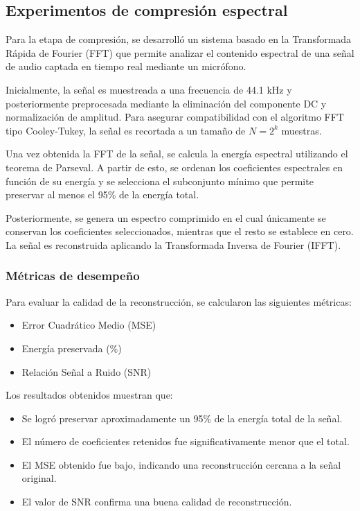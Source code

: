 \documentclass[12pt, journal]{IEEEtran}
\begin{document}
\subsection{Experimentos de compresión espectral}

Para la etapa de compresión, se desarrolló un sistema basado en la Transformada Rápida de Fourier (FFT) que permite analizar el contenido espectral de una señal de audio captada en tiempo real mediante un micrófono.

Inicialmente, la señal es muestreada a una frecuencia de 44.1 kHz y posteriormente preprocesada mediante la eliminación del componente DC y normalización de amplitud. Para asegurar compatibilidad con el algoritmo FFT tipo Cooley-Tukey, la señal es recortada a un tamaño de $N = 2^k$ muestras.

Una vez obtenida la FFT de la señal, se calcula la energía espectral utilizando el teorema de Parseval. A partir de esto, se ordenan los coeficientes espectrales en función de su energía y se selecciona el subconjunto mínimo que permite preservar al menos el 95\% de la energía total.

Posteriormente, se genera un espectro comprimido en el cual únicamente se conservan los coeficientes seleccionados, mientras que el resto se establece en cero. La señal es reconstruida aplicando la Transformada Inversa de Fourier (IFFT).

\subsubsection{Métricas de desempeño}

Para evaluar la calidad de la reconstrucción, se calcularon las siguientes métricas:

\begin{itemize}
    \item Error Cuadrático Medio (MSE)
    \item Energía preservada (\%)
    \item Relación Señal a Ruido (SNR)
\end{itemize}

Los resultados obtenidos muestran que:

\begin{itemize}
    \item Se logró preservar aproximadamente un 95\% de la energía total de la señal.
    \item El número de coeficientes retenidos fue significativamente menor que el total.
    \item El MSE obtenido fue bajo, indicando una reconstrucción cercana a la señal original.
    \item El valor de SNR confirma una buena calidad de reconstrucción.
\end{itemize}
\end{document}

